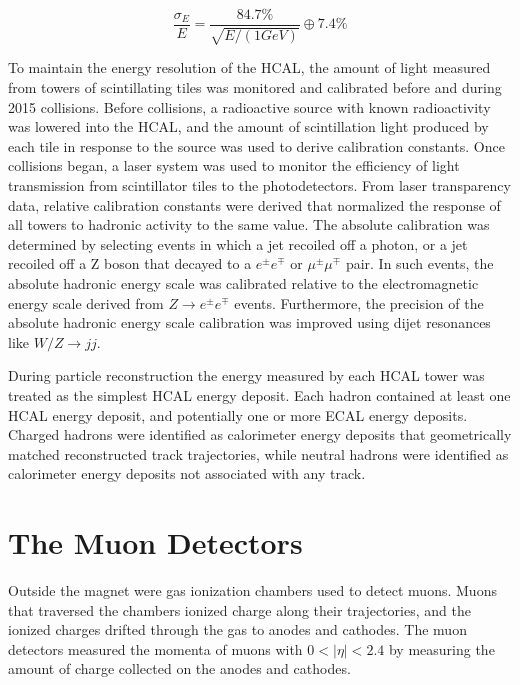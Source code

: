 \begin{equation}
	\frac{\sigma_{E}}{E} = \frac{84.7\%}{\sqrt{E/(1 GeV)}} \oplus 7.4\%
\end{equation}

To maintain the energy resolution of the HCAL, the amount of light measured from towers of scintillating tiles 
was monitored and calibrated before and during 2015 collisions.  Before collisions, a radioactive source 
with known radioactivity was lowered into the HCAL, and the amount of scintillation light produced by each tile 
in response to the source was used to derive calibration constants.  Once collisions began, a laser system 
was used to monitor the efficiency of light transmission from scintillator tiles to the photodetectors.  
From laser transparency data, relative calibration constants were 
derived that normalized the response of all towers to hadronic activity to the same value.  The absolute 
calibration was determined by selecting events in which a jet recoiled off a photon, or a jet recoiled off a Z boson that 
decayed to a $e^{\pm}e^{\mp}$ or $\mu^{\pm}\mu^{\mp}$ pair.  In such events, the absolute hadronic energy 
scale was calibrated relative to the electromagnetic energy scale derived from $Z \rightarrow e^{\pm}e^{\mp}$ 
events.  Furthermore, the precision of the absolute hadronic energy scale calibration was improved using 
dijet resonances like $W/Z \rightarrow jj$.

During particle reconstruction the energy measured by each HCAL tower was treated as the simplest HCAL energy 
deposit.  Each hadron contained at least one HCAL energy deposit, and potentially one or more ECAL energy 
deposits.  Charged hadrons were identified as calorimeter energy deposits that geometrically matched reconstructed 
track trajectories, while neutral hadrons were identified as calorimeter energy deposits not associated with any 
track.

\section{The Muon Detectors}
\label{sec:muonDetectorsDescription}
Outside the magnet were gas ionization chambers used to detect muons.  Muons that traversed the chambers 
ionized charge along their trajectories, and the ionized charges drifted through the gas to anodes and 
cathodes.  The muon detectors measured the momenta of muons with $0 < |\eta| < 2.4$ by measuring the amount of 
charge collected on the anodes and cathodes.

